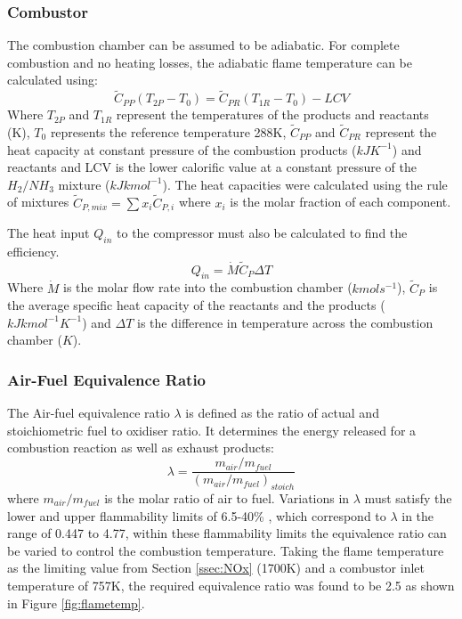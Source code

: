 \subsubsection{Combustor} 
The combustion chamber can be assumed to be adiabatic. For complete combustion and no heating losses, the adiabatic flame temperature can be calculated using:
\begin{equation}
\tilde{C}_{PP} (T_{2P} - T_0) = \tilde{C}_{PR} (T_{1R} - T_0) - LCV 
\end{equation}
Where $T_{2P}$ and $T_{1R}$ represent the temperatures of the products and reactants (K), $T_0$ represents the reference temperature 288K, $\tilde{C}_{PP}$ and $\tilde{C}_{PR}$ represent the heat capacity at constant pressure of the combustion products ($kJK^{-1}$) and reactants and LCV is the lower calorific value at a constant pressure of the $H_2/NH_3$ mixture ($kJkmol^{-1}$). The heat capacities were calculated using the rule of mixtures $\tilde{C}_{P, mix} = \sum\nolimits x_i \tilde{C}_{P, i}$ where $x_i$ is the molar fraction of each component. 

The heat input $Q_{in}$ to the compressor must also be calculated to find the efficiency.
\begin{equation} \label{eq:heatequation}
Q_{in} = \dot{M}\tilde{C}_P\Delta T
\end{equation}
Where $\dot{M}$ is the molar flow rate into the combustion chamber ($kmols^{-1}$), $\tilde{C}_P$ is the average specific heat capacity of the reactants and the products ($kJ kmol^{-1} K^{-1}$) and $\Delta T$ is the difference in temperature across the combustion chamber ($K$).


\subsubsection{Air-Fuel Equivalence Ratio} 
The Air-fuel equivalence ratio $\lambda$ is defined as the ratio of actual and stoichiometric fuel to oxidiser ratio. It determines the energy released for a combustion reaction as well as exhaust products: \begin{equation}
\lambda = \frac{m_{air}/m_{fuel}}{(m_{air}/m_{fuel})_{stoich}}
\end{equation}
where $m_{air}/m_{fuel}$ is the molar ratio of air to fuel. Variations in $\lambda$ must satisfy the lower and upper flammability limits of 6.5-40\% \cite{FL}, which correspond to $\lambda$ in the range of 0.447 to 4.77, within these flammability limits the equivalence ratio can be varied to control the combustion temperature.
Taking the flame temperature as the limiting value from Section \ref{ssec:NOx} (1700K) and a combustor inlet temperature of 757K, the required equivalence ratio was found to be 2.5 as shown in Figure \ref{fig:flametemp}.

